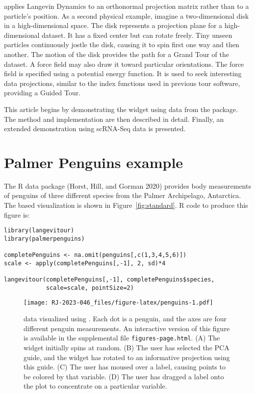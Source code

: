  applies Langevin Dynamics to an orthonormal projection matrix rather than to a particle's position. As a second physical example, imagine a two-dimensional disk in a high-dimensional space. The disk represents a projection plane for a high-dimensional dataset. It has a fixed center but can rotate freely. Tiny unseen particles continuously jostle the disk, causing it to spin first one way and then another. The motion of the disk provides the path for a Grand Tour of the dataset. A force field may also draw it toward particular orientations. The force field is specified using a potential energy function. It is used to seek interesting data projections, similar to the index functions used in previous tour software, providing a Guided Tour.

This article begins by demonstrating the widget using data from the  package. The method and implementation are then described in detail. Finally, an extended demonstration using scRNA-Seq data is presented.

\hypertarget{palmer-penguins-example}{%
\section{Palmer Penguins example}\label{palmer-penguins-example}}

The R data package  (Horst, Hill, and Gorman 2020) provides body measurements of penguins of three different species from the Palmer Archipelago, Antarctica. The  based visualization is shown in Figure~\ref{fig:standard}. R code to produce this figure is:

\begin{verbatim}
library(langevitour)
library(palmerpenguins)

completePenguins <- na.omit(penguins[,c(1,3,4,5,6)])
scale <- apply(completePenguins[,-1], 2, sd)*4

langevitour(completePenguins[,-1], completePenguins$species, 
            scale=scale, pointSize=2)
\end{verbatim}

\begin{figure}
\centering
\texttt{[image: RJ-2023-046\_files/figure-latex/penguins-1.pdf]}
\caption{\label{fig:penguins} data visualized using . Each dot is a penguin, and the axes are four different penguin measurements. An interactive version of this figure is available in the supplemental file \texttt{figures-page.html}. (A) The widget initially spins at random. (B) The user has selected the PCA guide, and the widget has rotated to an informative projection using this guide. (C) The user has moused over a label, causing points to be colored by that variable. (D) The user has dragged a label onto the plot to concentrate on a particular variable.}
\end{figure}


